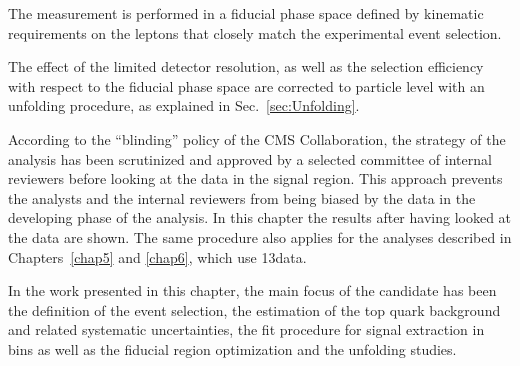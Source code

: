 The measurement is performed in a fiducial phase space defined by kinematic requirements on
the leptons that closely match the experimental event selection.

The effect of the limited detector resolution, as well as the
selection efficiency with respect to the fiducial phase space are corrected to
particle level with an unfolding procedure, as explained in Sec.~\ref{sec:Unfolding}.

According to the ``blinding'' policy of the CMS Collaboration, the strategy of the analysis has been scrutinized and approved by a selected committee of internal reviewers before looking at the data in the signal region. This approach prevents the analysts and the internal reviewers from being biased by the data in the developing phase of the analysis. In this chapter the results after having looked at the data are shown. The same procedure also applies for the analyses described in Chapters~\ref{chap5} and \ref{chap6}, which use 13\TeV data.

In the work presented in this chapter, the main focus of the candidate has been the definition of the event selection, the estimation of the top quark background and related systematic uncertainties, the fit procedure for signal extraction in \pth bins as well as the fiducial region optimization and the unfolding studies. 








\clearpage

